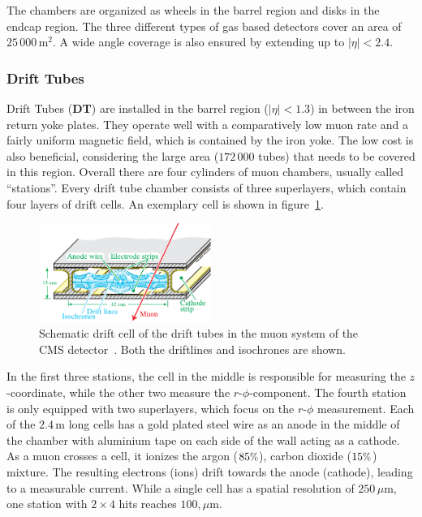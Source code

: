 The chambers are organized as wheels in the barrel region and disks in the endcap region. The three different types of gas based detectors cover an area of $25\,000\,\text{m}^2$. A wide angle coverage is also ensured by extending up to $|\eta| < 2.4$.

\subsubsection{Drift Tubes}
\label{sec:drift-tubes}

Drift Tubes (\textbf{DT}) are installed in the barrel region ($|\eta| < 1.3$) in between the iron return yoke plates. They operate well with a comparatively low muon rate and a fairly uniform magnetic field, which is contained by the iron yoke. The low cost is also beneficial, considering the large area ($172\,000$ tubes) that needs to be covered in this region. Overall there are four cylinders of muon chambers, usually called ``stations''. Every drift tube chamber consists of three superlayers, which contain four layers of drift cells. An exemplary cell is shown in figure~\ref{fig:drift-cell}.

\begin{figure}[!htb]
  \centering
  \includegraphics[width=0.5\textwidth]{plots/driftcell.pdf}  
  \caption{Schematic drift cell of the drift tubes in the muon system of the CMS detector~\cite{driftcell}. Both the driftlines and isochrones are shown.}
  \label{fig:drift-cell}
\end{figure}

In the first three stations, the cell in the middle is responsible for measuring the $z$-coordinate, while the other two measure the $r$-$\phi$-component. The fourth station is only equipped with two superlayers, which focus on the $r$-$\phi$ measurement. Each of the $2.4\,\text{m}$ long cells has a gold plated steel wire as an anode in the middle of the chamber with aluminium tape on each side of the wall acting as a cathode. As a muon crosses a cell, it ionizes the argon ($85\pct$), carbon dioxide ($15\pct$) mixture. The resulting electrons (ions) drift towards the anode (cathode), leading to a measurable current. While a single cell has a spatial resolution of $250\,\mu\text{m}$, one station with $2 \times 4$ hits reaches $100,\mu\text{m}$.

